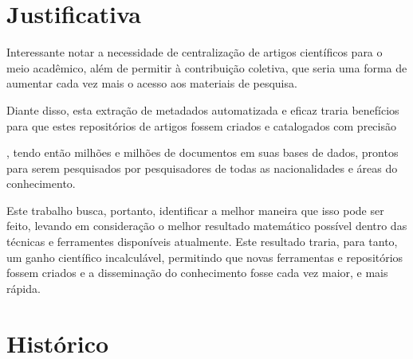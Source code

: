 \section{Justificativa}
\label{sec:justification}


\begin{textedited}
Interessante notar a necessidade de centralização de artigos científicos para o meio acadêmico, além de permitir à contribuição coletiva, que seria uma forma de aumentar cada vez mais o acesso aos materiais de pesquisa. 

Diante disso, esta extração de metadados automatizada e eficaz traria benefícios para que estes repositórios de artigos fossem criados e catalogados com precisão\end{textedited}, tendo então milhões e milhões de documentos em suas bases de dados, prontos para serem pesquisados por pesquisadores de todas as nacionalidades e áreas do conhecimento.

\begin{textedited}
Este trabalho busca, portanto, identificar a melhor maneira que isso pode ser feito, levando em consideração o melhor resultado matemático possível dentro das técnicas e ferramentes disponíveis atualmente. Este resultado traria, para tanto, um ganho científico incalculável, permitindo que novas ferramentas e repositórios fossem criados e a disseminação do conhecimento fosse cada vez maior, e mais rápida.
\end{textedited}

\section{Histórico}
\label{sec:history}



